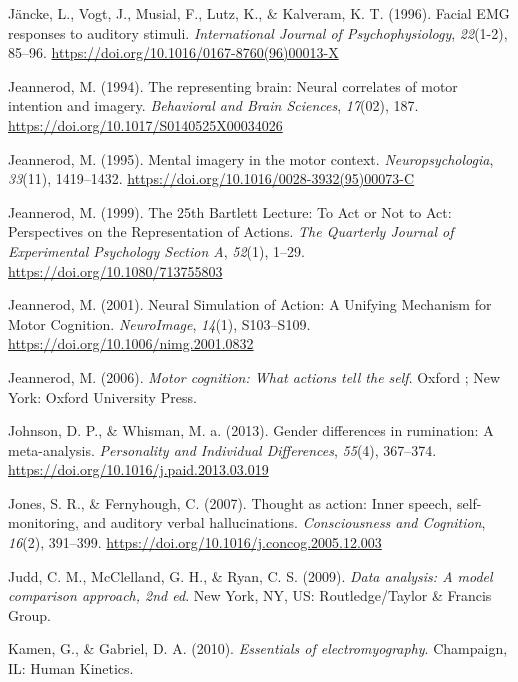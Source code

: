 \documentclass[a4paper,12pt,twoside,openright,oldfontcommands]{memoir}
\begin{document}
\hypertarget{ref-Jancke1996}{}
Jäncke, L., Vogt, J., Musial, F., Lutz, K., \& Kalveram, K. T. (1996).
Facial EMG responses to auditory stimuli. \emph{International Journal of
Psychophysiology}, \emph{22}(1-2), 85--96.
\url{https://doi.org/10.1016/0167-8760(96)00013-X}

\hypertarget{ref-jeannerod_representing_1994}{}
Jeannerod, M. (1994). The representing brain: Neural correlates of motor
intention and imagery. \emph{Behavioral and Brain Sciences},
\emph{17}(02), 187. \url{https://doi.org/10.1017/S0140525X00034026}

\hypertarget{ref-jeannerod_mental_1995}{}
Jeannerod, M. (1995). Mental imagery in the motor context.
\emph{Neuropsychologia}, \emph{33}(11), 1419--1432.
\url{https://doi.org/10.1016/0028-3932(95)00073-C}

\hypertarget{ref-jeannerod_25th_1999}{}
Jeannerod, M. (1999). The 25th Bartlett Lecture: To Act or Not to Act:
Perspectives on the Representation of Actions. \emph{The Quarterly
Journal of Experimental Psychology Section A}, \emph{52}(1), 1--29.
\url{https://doi.org/10.1080/713755803}

\hypertarget{ref-jeannerod_neural_2001}{}
Jeannerod, M. (2001). Neural Simulation of Action: A Unifying Mechanism
for Motor Cognition. \emph{NeuroImage}, \emph{14}(1), S103--S109.
\url{https://doi.org/10.1006/nimg.2001.0832}

\hypertarget{ref-jeannerod_motor_2006}{}
Jeannerod, M. (2006). \emph{Motor cognition: What actions tell the
self}. Oxford ; New York: Oxford University Press.

\hypertarget{ref-Johnson2013}{}
Johnson, D. P., \& Whisman, M. a. (2013). Gender differences in
rumination: A meta-analysis. \emph{Personality and Individual
Differences}, \emph{55}(4), 367--374.
\url{https://doi.org/10.1016/j.paid.2013.03.019}

\hypertarget{ref-Jones2007}{}
Jones, S. R., \& Fernyhough, C. (2007). Thought as action: Inner speech,
self-monitoring, and auditory verbal hallucinations. \emph{Consciousness
and Cognition}, \emph{16}(2), 391--399.
\url{https://doi.org/10.1016/j.concog.2005.12.003}

\hypertarget{ref-judd_data_2009}{}
Judd, C. M., McClelland, G. H., \& Ryan, C. S. (2009). \emph{Data
analysis: A model comparison approach, 2nd ed}. New York, NY, US:
Routledge/Taylor \& Francis Group.

\hypertarget{ref-kamen_essentials_2010}{}
Kamen, G., \& Gabriel, D. A. (2010). \emph{Essentials of
electromyography}. Champaign, IL: Human Kinetics.
\end{document}
